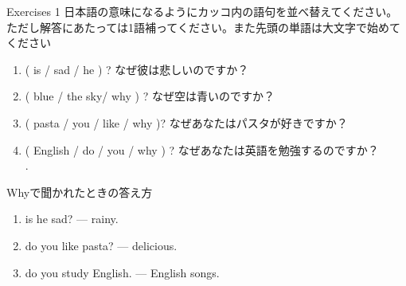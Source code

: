 \documentclass[aspectratio=169,xcolor={dvipsnames,table}]{beamer}
\begin{document}
\begin{frame}[plain]{Exercises 1}
日本語の意味になるようにカッコ内の語句を並べ替えてください。ただし解答にあたっては1語補ってください。また先頭の単語は大文字で始めてください
 \begin{enumerate}
  \item ( is / sad / he ) ? なぜ彼は悲しいのですか？\\
  \item ( blue / the sky/ why ) ? なぜ空は青いのですか？\\
  \item ( pasta / you / like / why )? なぜあなたはパスタが好きですか？\\
  \item ( English / do / you / why ) ? なぜあなたは英語を勉強するのですか？\\
.
 \end{enumerate}
\end{frame}
\begin{frame}[plain]{Whyで聞かれたときの答え方}
 \begin{enumerate}
  \item {} is he sad? ---   rainy.
  \item {} do you like pasta? ---   delicious.
  \item {} do you study English. ---   English songs.
 \end{enumerate}

\end{frame}
\end{document}
